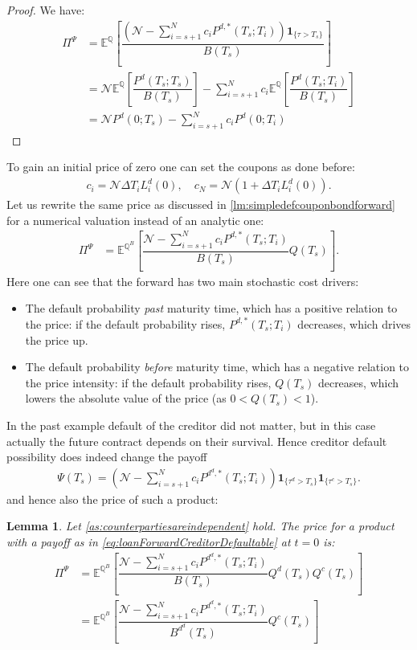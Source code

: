 \documentclass[12pt]{article}
\newtheorem{lemma}[theorem]{Lemma}
\begin{document}
	\begin{proof}
		We have:
		\begin{align*}
			\Pi^\Psi &= \mathbb{E}^{\mathbb{Q}}\left[\dfrac{\left(\mathcal{N} - \sum_{i=s+1}^{N}c_iP^{d,*}(T_s; T_i)\right)\mathbf{1}_{\{\tau > T_s\}}}{B(T_s)}\right]\\
			&=\mathcal{N}\mathbb{E}^{\mathbb{Q}}\left[\dfrac{P^d(T_s;T_s)}{B(T_s)}\right] - \sum_{i=s+1}^{N} c_i \mathbb{E}^{\mathbb{Q}}\left[\dfrac{P^d(T_s;T_i)}{B(T_s)}\right]\\
			&= \mathcal{N}P^d(0;T_s) - \sum_{i=s+1}^{N} c_i P^d(0;T_i)
		\end{align*}
	\end{proof}
	To gain an initial price of zero one can set the coupons as done before:
	\begin{align*}
		c_i = \mathcal{N}\Delta T_iL^d_i(0), \quad c_N = \mathcal{N}\left(1 + \Delta T_iL^d_i(0)\right).
	\end{align*}
	Let us rewrite the same price as discussed in \cref{lm:simpledefcouponbondforward} for a numerical valuation instead of an analytic one:
	\begin{align*}
		\Pi^\Psi &= \mathbb{E}^{\mathbb{Q}^B}\left[\dfrac{\mathcal{N} - \sum_{i=s+1}^{N}c_iP^{d,*}(T_s; T_i)}{B(T_s)}Q(T_s)\right].
	\end{align*}
	Here one can see that the forward has two main stochastic cost drivers: 
	\begin{itemize}
		\item The default probability \emph{past} maturity time, which has a positive relation to the price: if the default probability rises, $P^{d,*}(T_s;T_i)$ decreases, which drives the price up.
		\item The default probability \emph{before} maturity time, which has a negative relation to the price intensity: if the default probability rises, $Q(T_s)$ decreases, which lowers the absolute value of the price (as $0 < Q(T_s) < 1$).
	\end{itemize}
	In the past example default of the creditor did not matter, but in this case actually the future contract depends on their survival. Hence creditor default possibility does indeed change the payoff
	\begin{align}\label{eq:loanForwardCreditorDefaultable}
		\Psi(T_s) = \left(\mathcal{N} - \sum_{i=s+1}^{N}c_iP^{d^d,*}(T_s; T_i)\right)\mathbf{1}_{\{\tau^d > T_s\}}\mathbf{1}_{\{\tau^c > T_s\}}.
	\end{align}
	and hence also the price of such a product:
	\begin{lemma}
		Let \cref{as:counterpartiesareindependent} hold. The price for a product with a payoff as in \cref{eq:loanForwardCreditorDefaultable} at $t=0$ is:
		\begin{align*}
			\Pi^\Psi &= \mathbb{E}^{\mathbb{Q}^B}\left[\dfrac{\mathcal{N} - \sum_{i=s+1}^{N}c_iP^{d^d,*}(T_s; T_i)}{B(T_s)}Q^d(T_s)Q^c(T_s)\right]\\
			&= \mathbb{E}^{\mathbb{Q}^B}\left[\dfrac{\mathcal{N} - \sum_{i=s+1}^{N}c_iP^{d^d,*}(T_s; T_i)}{B^{d^d}(T_s)}Q^c(T_s)\right]
		\end{align*}
	\end{lemma}
\end{document}
